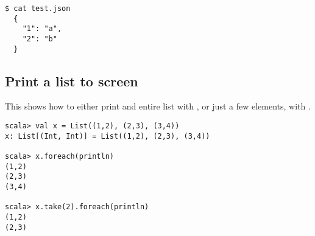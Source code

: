   \begin{lstlisting}[style=bash]
  $ cat test.json 
  {
    "1": "a",
    "2": "b"
  }
  \end{lstlisting}


\subsection{Print a list to screen}

This shows how to either print and entire list with , or
just a few elements, with .

\begin{lstlisting}[style=bash]
scala> val x = List((1,2), (2,3), (3,4))
x: List[(Int, Int)] = List((1,2), (2,3), (3,4))

scala> x.foreach(println)
(1,2)
(2,3)
(3,4)

scala> x.take(2).foreach(println)
(1,2)
(2,3)
\end{lstlisting}
